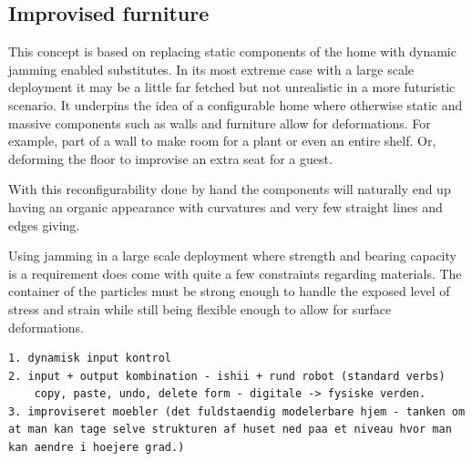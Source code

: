 \subsection{Improvised furniture}
\label{ch:jamming:concepts:improvised_furniture}

This concept is based on replacing static components of the home with dynamic jamming enabled substitutes.
In its most extreme case with a large scale deployment it may be a little far fetched but not unrealistic in a more futuristic scenario.
It underpins the idea of a configurable home where otherwise static and massive components such as walls and furniture allow for deformations.
For example,  part of a wall to make room for a plant or even an entire shelf.
Or, deforming the floor to improvise an extra seat for a guest.

With this reconfigurability done by hand the components will naturally end up having an organic appearance with curvatures and very few straight lines and edges giving.

Using jamming in a large scale deployment where strength and bearing capacity is a requirement does come with quite a few constraints regarding materials.
The container of the particles must be strong enough to handle the exposed level of stress and strain while still being flexible enough to allow for surface deformations.

\begin{verbatim}
1. dynamisk input kontrol
2. input + output kombination - ishii + rund robot (standard verbs)
	copy, paste, undo, delete form - digitale -> fysiske verden.
3. improviseret moebler (det fuldstaendig modelerbare hjem - tanken om at man kan tage selve strukturen af huset ned paa et niveau hvor man kan aendre i hoejere grad.)

\end{verbatim}

